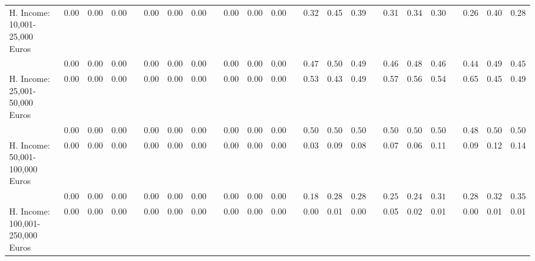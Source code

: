 \begin{center}
{\begin{longtable}{L{12em} c c c p{1.2em} c c c p{1.2em} c c c p{1.2em} c c c p{1.2em} c c c p{1.2em} c c c}
H. Income: 10,001-25,000 Euros & 0.00 &      0.00 &      0.00 & &      0.00 &      0.00 &      0.00 & &      0.00 &      0.00 &      0.00 & &      0.32 &      0.45 &      0.39 & &      0.31 &      0.34 &      0.30 & &      0.26 &      0.40 &      0.28 \\*
& $\mathit{     0.00}$ & $\mathit{     0.00}$ & $\mathit{     0.00}$ & & $\mathit{     0.00}$ & $\mathit{     0.00}$ & $\mathit{     0.00}$ & & $\mathit{     0.00}$ & $\mathit{     0.00}$ & $\mathit{     0.00}$ & & $\mathit{     0.47}$ & $\mathit{     0.50}$ & $\mathit{     0.49}$ & & $\mathit{     0.46}$ & $\mathit{     0.48}$ & $\mathit{     0.46}$ & & $\mathit{     0.44}$ & $\mathit{     0.49}$ & $\mathit{     0.45}$ \\[.7em]
H. Income: 25,001-50,000 Euros & 0.00 &      0.00 &      0.00 & &      0.00 &      0.00 &      0.00 & &      0.00 &      0.00 &      0.00 & &      0.53 &      0.43 &      0.49 & &      0.57 &      0.56 &      0.54 & &      0.65 &      0.45 &      0.49 \\*
& $\mathit{     0.00}$ & $\mathit{     0.00}$ & $\mathit{     0.00}$ & & $\mathit{     0.00}$ & $\mathit{     0.00}$ & $\mathit{     0.00}$ & & $\mathit{     0.00}$ & $\mathit{     0.00}$ & $\mathit{     0.00}$ & & $\mathit{     0.50}$ & $\mathit{     0.50}$ & $\mathit{     0.50}$ & & $\mathit{     0.50}$ & $\mathit{     0.50}$ & $\mathit{     0.50}$ & & $\mathit{     0.48}$ & $\mathit{     0.50}$ & $\mathit{     0.50}$ \\[.7em]
H. Income: 50,001-100,000 Euros & 0.00 &      0.00 &      0.00 & &      0.00 &      0.00 &      0.00 & &      0.00 &      0.00 &      0.00 & &      0.03 &      0.09 &      0.08 & &      0.07 &      0.06 &      0.11 & &      0.09 &      0.12 &      0.14 \\*
& $\mathit{     0.00}$ & $\mathit{     0.00}$ & $\mathit{     0.00}$ & & $\mathit{     0.00}$ & $\mathit{     0.00}$ & $\mathit{     0.00}$ & & $\mathit{     0.00}$ & $\mathit{     0.00}$ & $\mathit{     0.00}$ & & $\mathit{     0.18}$ & $\mathit{     0.28}$ & $\mathit{     0.28}$ & & $\mathit{     0.25}$ & $\mathit{     0.24}$ & $\mathit{     0.31}$ & & $\mathit{     0.28}$ & $\mathit{     0.32}$ & $\mathit{     0.35}$ \\[.7em]
H. Income: 100,001-250,000 Euros & 0.00 &      0.00 &      0.00 & &      0.00 &      0.00 &      0.00 & &      0.00 &      0.00 &      0.00 & &      0.00 &      0.01 &      0.00 & &      0.05 &      0.02 &      0.01 & &      0.00 &      0.01 &      0.01 \\*

\end{longtable}}
\end{center}
